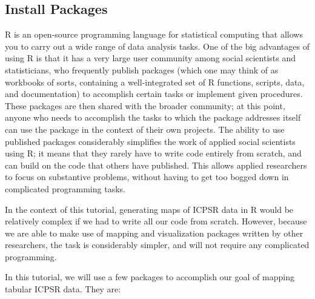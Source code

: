 \documentclass[
]{article}
\begin{document}
\hypertarget{install-packages}{%
\subsection{Install Packages}\label{install-packages}}

R is an open-source programming language for statistical computing that allows you to carry out a wide range of data analysis tasks. One of the big advantages of using R is that it has a very large user community among social scientists and statisticians, who frequently publish packages (which one may think of as workbooks of sorts, containing a well-integrated set of R functions, scripts, data, and documentation) to accomplish certain tasks or implement given procedures. These packages are then shared with the broader community; at this point, anyone who needs to accomplish the tasks to which the package addresses itself can use the package in the context of their own projects. The ability to use published packages considerably simplifies the work of applied social scientists using R; it means that they rarely have to write code entirely from scratch, and can build on the code that others have published. This allows applied researchers to focus on substantive problems, without having to get too bogged down in complicated programming tasks.

In the context of this tutorial, generating maps of ICPSR data in R would be relatively complex if we had to write all our code from scratch. However, because we are able to make use of mapping and visualization packages written by other researchers, the task is considerably simpler, and will not require any complicated programming.

In this tutorial, we will use a few packages to accomplish our goal of mapping tabular ICPSR data. They are:
\end{document}

